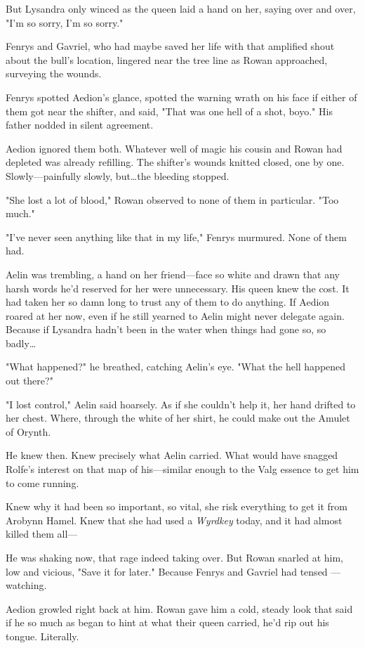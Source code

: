 But Lysandra only winced as the queen laid a hand on her, saying over and over, "I'm so sorry, I'm so sorry."

Fenrys and Gavriel, who had maybe saved her life with that amplified shout about the bull's location, lingered near the tree line as Rowan approached, surveying the wounds.

Fenrys spotted Aedion's glance, spotted the warning wrath on his face if either of them got near the shifter, and said, "That was one hell of a shot, boyo."
His father nodded in silent agreement.

Aedion ignored them both.
Whatever well of magic his cousin and Rowan had depleted was already refilling.
The shifter's wounds knitted closed, one by one.
Slowly---painfully slowly, but\ldots the bleeding stopped.

"She lost a lot of blood," Rowan observed to none of them in particular.
"Too much."

"I've never seen anything like that in my life," Fenrys murmured.
None of them had.

Aelin was trembling, a hand on her friend---face so white and drawn that any harsh words he'd reserved for her were unnecessary.
His queen knew the cost.
It had taken her so damn long to trust any of them to do anything.
If Aedion roared at her now, even if he still yearned to  Aelin might never delegate again.
Because if Lysandra hadn't been in the water when things had gone so, so badly\ldots{}

"What happened?"
he breathed, catching Aelin's eye.
"What the hell happened out there?"

"I lost control," Aelin said hoarsely.
As if she couldn't help it, her hand drifted to her chest.
Where, through the white of her shirt, he could make out the Amulet of Orynth.

He knew then.
Knew precisely what Aelin carried.
What would have snagged Rolfe's interest on that map of his---similar enough to the Valg essence to get him to come running.

Knew why it had been so important, so vital, she risk everything to get it from Arobynn Hamel.
Knew that she had used a \emph{Wyrdkey} today, and it had almost killed them all---

He was shaking now, that rage indeed taking over.
But Rowan snarled at him, low and vicious, "Save it for later."
Because Fenrys and Gavriel had tensed ---watching.

Aedion growled right back at him.
Rowan gave him a cold, steady look that said if he so much as began to hint at what their queen carried, he'd rip out his tongue.
Literally.

